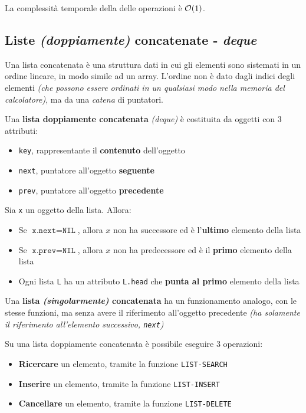 \documentclass[italian, 10pt]{article}
\begin{document}
La complessità temporale della delle operazioni è \(\mathcal{O}(1)\).

\subsection{Liste \textit{(doppiamente)} concatenate - \textit{deque}}
\label{sec:liste-concatenate}

Una lista concatenata è una struttura dati in cui gli elementi sono sistemati in un ordine lineare, in modo simile ad un array.
L'ordine non è dato dagli indici degli elementi \textit{(che possono essere ordinati in un qualsiasi modo nella memoria del calcolatore)}, ma da una \textit{catena} di puntatori.

Una \textbf{lista doppiamente concatenata} \textit{(deque)} è costituita da oggetti con \(3\) attributi:

\begin{itemize}
  \item \texttt{key}, rappresentante il \textbf{contenuto} dell'oggetto
  \item \texttt{next}, puntatore all'oggetto \textbf{seguente}
  \item \texttt{prev}, puntatore all'oggetto \textbf{precedente}
\end{itemize}

Sia \texttt{x} un oggetto della lista.
Allora:

\begin{itemize}
  \item Se \(\texttt{x.next} = \texttt{NIL}\), allora \(x\) non ha successore ed è l'\textbf{ultimo} elemento della lista
  \item Se \(\texttt{x.prev} = \texttt{NIL}\), allora \(x\) non ha predecessore ed è il \textbf{primo} elemento della lista
  \item Ogni lista \texttt{L} ha un attributo \texttt{L.head} che \textbf{punta al primo} elemento della lista
\end{itemize}

Una \textbf{lista \textit{(singolarmente)} concatenata} ha un funzionamento analogo, con le stesse funzioni, ma senza avere il riferimento all'oggetto precedente \textit{(ha solamente il riferimento all'elemento successivo, \texttt{next})}

\bigskip
Su una lista doppiamente concatenata è possibile eseguire \(3\) operazioni:

\begin{itemize}
  \item \textbf{Ricercare} un elemento, tramite la funzione \texttt{LIST-SEARCH}
  \item \textbf{Inserire} un elemento, tramite la funzione \texttt{LIST-INSERT}
  \item \textbf{Cancellare} un elemento, tramite la funzione \texttt{LIST-DELETE}
\end{itemize}
\end{document}
